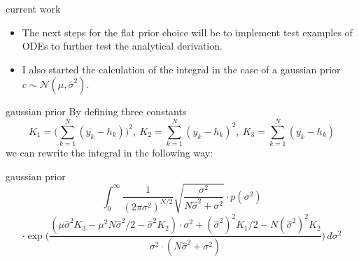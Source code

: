 \documentclass{beamer}
\newcommand{\s}{\sigma^2}
\newcommand{\sh}{\hat{\sigma}^2}
\begin{document}
\begin{frame}{current work}
	\begin{itemize}
	\item The next steps for the flat prior choice will be to implement test 
	examples of ODEs to further test the analytical derivation.
	\item I also started the calculation of the integral in the case of a gaussian 
	prior $c  \sim \mathcal{N}(\mu, \hat{\sigma}^2)$.
	\end{itemize}
\end{frame}

\begin{frame}{gaussian prior}
	By defining three constants
	\[
		K_1 = \biggl(\sum_{k = 1}^N (\overline{y_k} - h_k) \biggr)^2, \ K_2 
		= \sum_{k = 1}^N (\overline{y_k} - h_k)^2, \ K_3 = 
		\sum_{k = 1}^N (\overline{y_k} - h_k)
	\]
	we can rewrite the integral in the following way:
\end{frame}

\begin{frame}{gaussian prior}
	\[
    	\int_0^{\infty} \frac{1}{(2\pi\s)^{N/2}} \sqrt{\frac{\s}{N\sh + \s}} \cdot 
    	p(\s)
	\]
	\[
   		\cdot \exp \biggl(\frac{(\mu \sh K_3 - \mu^2 N \sh /2 - \sh K_2) \cdot \s 
   		+ (\sh)^2 K_1 /2 - N (\sh)^2 K_2}{\s \cdot (N\sh + \s)} \biggr)
   		 \, d\s
	\]
\end{frame}
\end{document}
